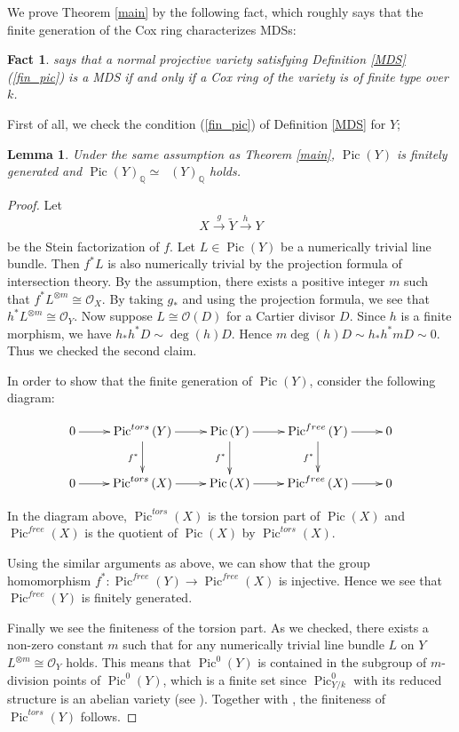 \documentclass[12pt,twoside]{amsart}
\newtheorem{lem}[theo]{Lemma}
\newtheorem{fact}[theo]{Fact}
\theoremstyle{definition}
\newcommand\Pic{\mathop{\mathrm{Pic}}\nolimits}
\newcommand\Num{\mathop{\mathrm{N}^{1}}\nolimits}
\newcommand\bq{\mathbb{Q}}
\newcommand\OO{\mathcal{O}}
\begin{document}
We prove Theorem \ref{main} by the following fact, which roughly says that the
finite generation of the Cox ring characterizes MDSs:

\begin{fact}\label{characterization}
\cite[Proposition 2.9]{hk} says that a normal projective variety satisfying
Definition \ref{MDS} (\ref{fin_pic}) is a MDS if and only if a Cox ring of the variety is of finite type over $k$.
\end{fact}




First of all, we check the condition (\ref{fin_pic}) of Definition \ref{MDS} for $Y$;
\begin{lem}\label{pic}
Under the same assumption as Theorem \ref{main},
$\Pic{(Y)}$ is finitely generated and $\Pic{(Y)}_{\bq} \simeq \Num{(Y)}_{\bq}$ holds.
\end{lem}
\begin{proof}
Let
\begin{equation*}
X\xrightarrow[]{g}\tilde{Y}\xrightarrow[]{h}Y 
\end{equation*}
be the Stein factorization of $f$.
Let $L\in\Pic{(Y)}$ be a numerically trivial line bundle. Then
$f^{*}L$ is also numerically trivial by the projection formula of intersection theory.
By the assumption, there exists a positive integer $m$ such that $f^{*}L^{\otimes m}\cong\mathcal{O}_X$.
By taking $g_{*}$ and using the projection formula, we see that $h^{*}L^{\otimes m}\cong\mathcal{O}_Y$.
Now suppose $L\cong\mathcal{O}(D)$ for a Cartier divisor $D$. Since $h$ is a finite morphism, we have
$h_*h^{*}D\sim\deg{(h)}D$. Hence $m\deg{(h)}D\sim h_*h^{*}mD\sim 0$. Thus we checked the
second claim.

In order to show that the finite generation of $\Pic{(Y)}$, consider the following diagram:

\[\xymatrix{
0 \ar[r]& \Pic^{tors}{(Y)} \ar[r] \ar[d]_{f^{*}} & \Pic{(Y)} \ar[r] \ar[d]_{f^{*}} & \Pic^{free}{(Y)} \ar[r] \ar[d]_{f^{*}} & 0\\
0 \ar[r]& \Pic^{tors}{(X)} \ar[r]  & \Pic{(X)} \ar[r]  & \Pic^{free}{(X)} \ar[r] & 0}\]

In the diagram above, $\Pic^{tors}{(X)}$ is the torsion part of $\Pic{(X)}$ and $\Pic^{free}{(X)}$ is the quotient of
$\Pic{(X)}$ by $\Pic^{tors}{(X)}$.

Using the similar arguments as above, we can show that the group homomorphism
$f^{*}:\Pic^{free}{(Y)}\to\Pic^{free}{(X)}$ is injective. Hence we see that $\Pic^{free}{(Y)}$ is finitely generated.

Finally we see the finiteness of the torsion part.
As we checked, there exists a non-zero constant $m$ such that for any numerically trivial line bundle $L$ on $Y$
$L^{\otimes m}\cong \OO_Y$ holds.
 This means that
$\Pic^0{(Y)}$ is contained in the subgroup of $m$-division points of $\Pic^0{(Y)}$, which is a finite set
since $\Pic^0_{Y/k}$ with its reduced structure is an abelian variety (see \cite[Remark 9.5.25]{fga}).
Together with \cite[Corollary 9.6.17]{fga}, the finiteness of $\Pic^{tors}{(Y)}$ follows.
\end{proof}
\end{document}
